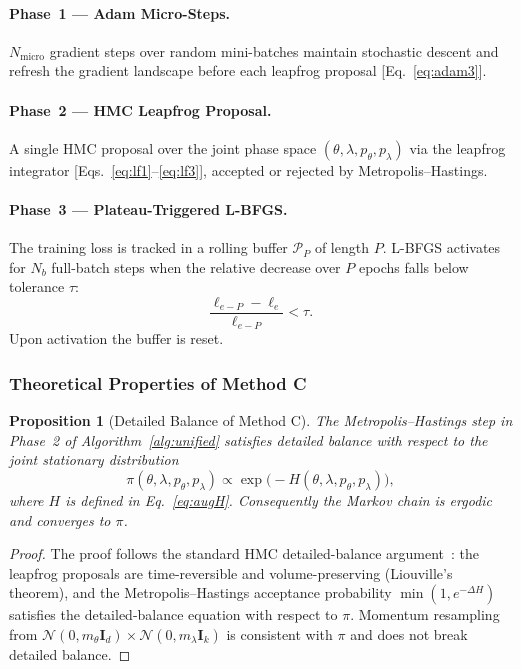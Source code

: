 \documentclass[11pt]{article}
\newtheorem{proposition}[theorem]{Proposition}
\theoremstyle{definition}
\newcommand{\calB}{\mathcal{P}}
\begin{document}
\paragraph{Phase~1 --- Adam Micro-Steps.}
$N_{\mathrm{micro}}$ gradient steps over random mini-batches maintain
stochastic descent and refresh the gradient landscape before each
leapfrog proposal [Eq.~\eqref{eq:adam3}].

\paragraph{Phase~2 --- HMC Leapfrog Proposal.}
A single HMC proposal over the joint phase space
$(\theta,\lambda,p_\theta,p_\lambda)$ via the leapfrog integrator
[Eqs.~\eqref{eq:lf1}--\eqref{eq:lf3}], accepted or rejected by
Metropolis--Hastings.

\paragraph{Phase~3 --- Plateau-Triggered L-BFGS.}
The training loss is tracked in a rolling buffer $\calB_P$ of length
$P$. L-BFGS activates for $N_b$ full-batch steps when the relative
decrease over $P$ epochs falls below tolerance $\tau$:
\begin{equation}
\frac{\ell_{e-P} - \ell_e}{\ell_{e-P}} < \tau.
\label{eq:plateau}
\end{equation}
Upon activation the buffer is reset.

\subsubsection{Theoretical Properties of Method C}

\begin{proposition}[Detailed Balance of Method C]
\label{prop:detailed_balance}
The Metropolis--Hastings step in Phase~2 of Algorithm~\ref{alg:unified}
satisfies detailed balance with respect to the joint stationary
distribution
\[
  \pi(\theta,\lambda,p_\theta,p_\lambda)
  \propto \exp\bigl(-H(\theta,\lambda,p_\theta,p_\lambda)\bigr),
\]
where $H$ is defined in Eq.~\eqref{eq:augH}. Consequently the Markov
chain is ergodic and converges to $\pi$.
\end{proposition}
\begin{proof}
The proof follows the standard HMC detailed-balance
argument~\cite[Sec.~5.2]{neal2011}: the leapfrog proposals are
time-reversible and volume-preserving (Liouville's theorem), and the
Metropolis--Hastings acceptance probability $\min(1,e^{-\Delta H})$
satisfies the detailed-balance equation with respect to $\pi$.
Momentum resampling from
$\mathcal{N}(0,m_\theta\mathbf{I}_d)\times\mathcal{N}(0,m_\lambda\mathbf{I}_k)$
is consistent with $\pi$ and does not break detailed balance.
\end{proof}
\end{document}
